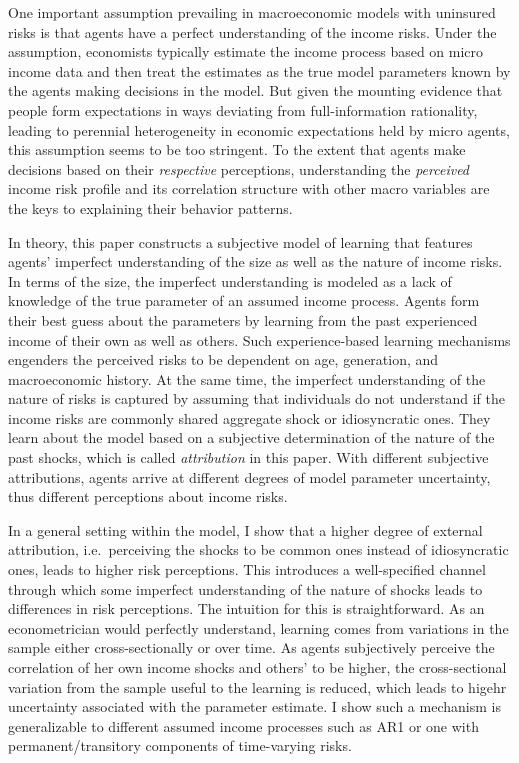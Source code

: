 \documentclass[12pt,notitlepage,onecolumn,aps,pra]{article}
\begin{document}
One important assumption prevailing in macroeconomic models with
uninsured risks is that agents have a perfect understanding of the
income risks. Under the assumption, economists typically estimate the
income process based on micro income data and then treat the estimates
as the true model parameters known by the agents making decisions in the
model. But given the mounting evidence that people form expectations in
ways deviating from full-information rationality, leading to perennial
heterogeneity in economic expectations held by micro agents, this
assumption seems to be too stringent. To the extent that agents make
decisions based on their \emph{respective} perceptions, understanding
the \emph{perceived} income risk profile and its correlation structure
with other macro variables are the keys to explaining their behavior
patterns.

In theory, this paper constructs a subjective model of learning that
features agents' imperfect understanding of the size as well as the
nature of income risks. In terms of the size, the imperfect
understanding is modeled as a lack of knowledge of the true parameter of
an assumed income process. Agents form their best guess about the
parameters by learning from the past experienced income of their own as
well as others. Such experience-based learning mechanisms engenders the
perceived risks to be dependent on age, generation, and macroeconomic
history. At the same time, the imperfect understanding of the nature of
risks is captured by assuming that individuals do not understand if the
income risks are commonly shared aggregate shock or idiosyncratic ones.
They learn about the model based on a subjective determination of the
nature of the past shocks, which is called \emph{attribution} in this
paper. With different subjective attributions, agents arrive at
different degrees of model parameter uncertainty, thus different
perceptions about income risks.

In a general setting within the model, I show that a higher degree of
external attribution, i.e.~perceiving the shocks to be common ones
instead of idiosyncratic ones, leads to higher risk perceptions. This
introduces a well-specified channel through which some imperfect
understanding of the nature of shocks leads to differences in risk
perceptions. The intuition for this is straightforward. As an
econometrician would perfectly understand, learning comes from
variations in the sample either cross-sectionally or over time. As
agents subjectively perceive the correlation of her own income shocks
and others' to be higher, the cross-sectional variation from the sample
useful to the learning is reduced, which leads to higehr uncertainty
associated with the parameter estimate. I show such a mechanism is
generalizable to different assumed income processes such as AR1 or one
with permanent/transitory components of time-varying risks.
\end{document}
